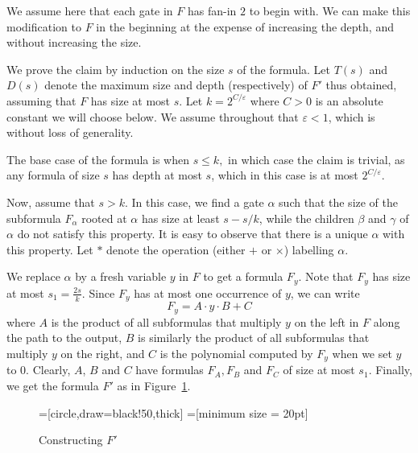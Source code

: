 \documentclass[11pt,a4paper]{article}
\begin{document}
We assume here that each gate in $F$ has fan-in $2$ to begin with. We can make this modification to $F$ in the beginning at the expense of increasing the depth, and without increasing the size.

We prove the claim by induction on the size $s$ of the formula. Let $T(s)$ and $D(s)$ denote the maximum size and depth (respectively) of $F'$ thus obtained, assuming that $F$ has size at most $s.$ Let $k = 2^{C/\varepsilon}$ where $C > 0$ is an absolute constant we will choose below. We assume throughout that $\varepsilon < 1$, which is without loss of generality.

The base case of the formula is when $s \leq k,$ in which case the claim is trivial, as any formula of size $s$ has depth at most $s$, which in this case is at most $2^{C/\varepsilon}.$

Now, assume that $s > k.$ In this case, we find a gate $\alpha$ 
such that the size of the subformula $F_\alpha$ rooted at $\alpha$ has size at least $s-s/k$, while the children $\beta$ and $\gamma$ of $\alpha$ do not satisfy this property. It is easy to observe that there is a unique $\alpha$ with this property. 
Let $*$ denote the operation (either $+$ or $\times$) labelling $\alpha.$

We replace $\alpha$ by a fresh variable $y$ in $F$ to get a formula $F_y$. Note that $F_y$ has size at most $s_1 =  \frac{2s}{k}.$ Since $F_y$ has at most one occurrence of $y$, we can write
\[
F_y = A \cdot y \cdot B + C 
\]
where $A$ is the product of all subformulas that multiply $y$ on the left in $F$ along the path to the output, $B$ is similarly the product of all subformulas that multiply $y$ on the right, and $C$ is the polynomial computed by $F_y$ when we set $y$ to $0$. Clearly, $A$, $B$ and $C$ have formulas $F_A, F_B$ and $F_C$ of size at most $s_1$. Finally, we get the formula $F'$ as in Figure~\ref{fig}.
\begin{figure}[h]
	\centering
	=[circle,draw=black!50,thick]
	=[minimum size = 20pt]
	\caption{Constructing $F'$}
	\label{fig}
\end{figure}
\end{document}

